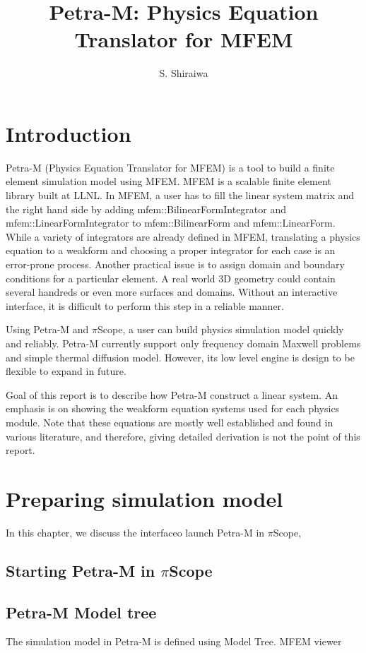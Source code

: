 \documentclass[11pt,a4paper,final]{report}
\author{S. Shiraiwa}
\title{Petra-M: Physics Equation Translator for MFEM}
\begin{document}
\lstset{language=Python}
\maketitle
\tableofcontents
\newpage

\chapter{Introduction}
Petra-M (Physics Equation Translator for MFEM) is a tool to build a finite element simulation model using MFEM. 
MFEM is a scalable finite element library built at LLNL. In MFEM,  a user has to fill the linear system matrix and the right hand side by adding  mfem::BilinearFormIntegrator and mfem::LinearFormIntegrator to mfem::BilinearForm and mfem::LinearForm.
While a variety of integrators are already defined in MFEM, translating a physics equation to a weakform and choosing a proper integrator for each case is an error-prone process. 
Another practical issue is to assign domain and boundary conditions for a particular element. A real world 3D geometry could contain several handreds or even more surfaces and domains. Without an interactive interface, it is difficult to perform this step in a reliable manner.

Using Petra-M and $\pi$Scope, a user can build physics simulation model quickly and reliably. Petra-M currently support only frequency domain Maxwell problems and simple thermal diffusion model. However, its low level engine is design to be flexible to expand in future.

Goal of this report is to describe how Petra-M construct a linear system. An emphasis is on showing the weakform equation systems used for each physics module. Note that these equations are mostly well established and found in various literature, and therefore, giving detailed derivation is not the point of this report. 


\chapter{Preparing simulation model}
In this chapter, we discuss the interfaceo launch Petra-M in $\pi$Scope, 
\section{Starting Petra-M in  $\pi$Scope}

\section{Petra-M Model tree}
The simulation model in Petra-M is defined using Model Tree. MFEM viewer
\end{document}
